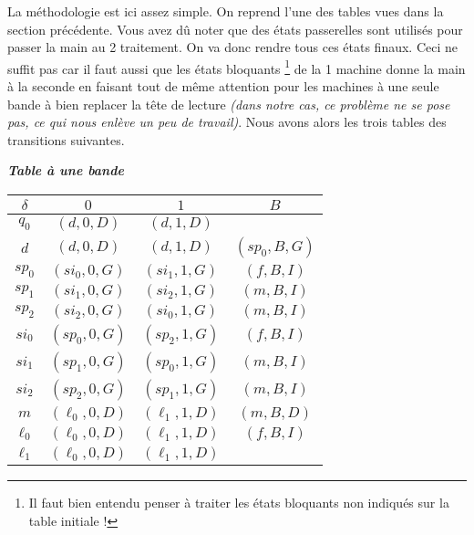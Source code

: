 La méthodologie est ici assez simple. On reprend l'une des tables vues dans la section précédente.
Vous avez dû noter que des états passerelles sont utilisés pour passer la main au 2\ieme{} traitement. On va donc rendre tous ces états finaux.
Ceci ne suffit pas car il faut aussi que les états bloquants
\footnote{
	Il faut bien entendu penser à traiter les états bloquants non indiqués sur la table initiale !
}
de la 1\iere{} machine donne la main à la seconde en faisant tout de même attention pour les machines à une seule bande à bien replacer la tête de lecture \emph{(dans notre cas, ce problème ne se pose pas, ce qui nous enlève un peu de travail)}.
Nous avons alors les trois tables des transitions suivantes.



\begin{center}
	\emph{\bfseries Table à une bande }
	
	\smallskip
	\begin{tabular}{|c||c|c|c|}
		\hline
		$\delta$ 
			& $0$ 
			& $1$
			& $B$ \\
		\hline
		\hline
		$q_0$ 
			& $(d , 0, D)$ 
			& $(d , 1, D)$
			&  \\
		\hline
		$d$ 
			& $(d , 0, D)$ 
			& $(d , 1, D)$
			& $(sp_0, B, G)$ \\
		\hline
		\hline
		$sp_0$ 
			& $(si_0 , 0, G)$ 
			& $(si_1 , 1, G)$
			& $(f    , B, I)$ \\
		\hline
		$sp_1$ 
			& $(si_1 , 0, G)$ 
			& $(si_2 , 1, G)$
			& $(m    , B, I)$ \\
		\hline
		$sp_2$ 
			& $(si_2 , 0, G)$ 
			& $(si_0 , 1, G)$
			& $(m    , B, I)$ \\
		\hline
		\hline
		$si_0$ 
			& $(sp_0 , 0, G)$ 
			& $(sp_2 , 1, G)$
			& $(f    , B, I)$ \\
		\hline
		$si_1$ 
			& $(sp_1 , 0, G)$ 
			& $(sp_0 , 1, G)$
			& $(m    , B, I)$ \\
		\hline
		$si_2$ 
			& $(sp_2 , 0, G)$ 
			& $(sp_1 , 1, G)$
			& $(m    , B, I)$ \\
		\hline
		\hline
		$m$
			& $(\ell_0 , 0 , D)$
			& $(\ell_1 , 1 , D)$
			& $(m      , B , D)$ \\
		\hline
		\hline
		$\ell_0$
			& $(\ell_0 , 0 , D)$
			& $(\ell_1 , 1 , D)$
			& $(f      , B , I)$ \\
		\hline
		$\ell_1$
			& $(\ell_0 , 0 , D)$
			& $(\ell_1 , 1 , D)$
			&                    \\
		\hline
	\end{tabular}
\end{center}



